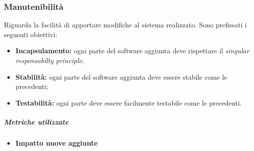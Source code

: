 \subsubsection{Manutenibilità}
Riguarda la facilità di apportare modifiche al sistema realizzato. Sono prefissati i seguenti obiettivi:
\begin{itemize}
	\item \textbf{Incapsulamento:} ogni parte del software aggiunta deve rispettare il \textit{singular responsabilty principle};
	\item \textbf{Stabilità:} ogni parte del software aggiunta deve essere stabile come le precedenti;
	\item \textbf{Testabilità:} ogni parte deve essere facilmente testabile come le precedenti.
\end{itemize}
\vspace{0.8cm}
\subparagraph{Metriche utilizzate}
\begin{itemize}
	\item \textbf{Impatto nuove aggiunte}
\end{itemize}
\begin{table}[!htpb]
	\centering
	\renewcommand{\arraystretch}{2} 
	\caption{Metriche utilizzate Manutenibilità}
\end{table}
